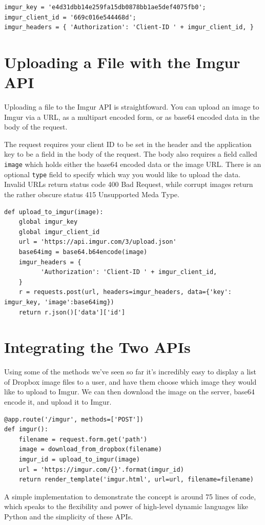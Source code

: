 \documentclass[12pt]{article}
\begin{document}
\begin{lstlisting}
imgur_key = 'e4d31dbb14e259fa15db0878bb1ae5def4075fb0';
imgur_client_id = '669c016e544468d';
imgur_headers = { 'Authorization': 'Client-ID ' + imgur_client_id, }
\end{lstlisting}


\section{Uploading a File with the Imgur API}
Uploading a file to the Imgur API is straightfoward. You can upload an image to Imgur via a URL, as a multipart encoded form, or as base64 encoded data in the body of the request. 

The request requires your client ID to be set in the header and the application key to be a field in the body of the request. The body also requires a field called \texttt{image} which holds either the base64 encoded data or the image URL. There is an optional \texttt{type} field to specify which way you would like to upload the data. Invalid URLs return status code 400 Bad Request, while corrupt images return the rather obscure status 415 Unsupported Meda Type.

\begin{lstlisting}
def upload_to_imgur(image):
    global imgur_key
    global imgur_client_id
    url = 'https://api.imgur.com/3/upload.json'
    base64img = base64.b64encode(image)
    imgur_headers = {
          'Authorization': 'Client-ID ' + imgur_client_id,
    }
    r = requests.post(url, headers=imgur_headers, data={'key': imgur_key, 'image':base64img})
    return r.json()['data']['id']
\end{lstlisting}

\section{Integrating the Two APIs}
Using some of the methods we've seen so far it's incredibly easy to display a list of Dropbox image files to a user, and have them choose which image they would like to upload to Imgur. We can then download the image on the server, base64 encode it, and upload it to Imgur.

\begin{lstlisting}
@app.route('/imgur', methods=['POST'])
def imgur():
    filename = request.form.get('path')
    image = download_from_dropbox(filename)
    imgur_id = upload_to_imgur(image)
    url = 'https://imgur.com/{}'.format(imgur_id)
    return render_template('imgur.html', url=url, filename=filename)
\end{lstlisting}
A simple implementation to demonstrate the concept is around 75 lines of code, which speaks to the flexibility and power of high-level dynamic languages like Python and the simplicity of these APIs.
\end{document}
